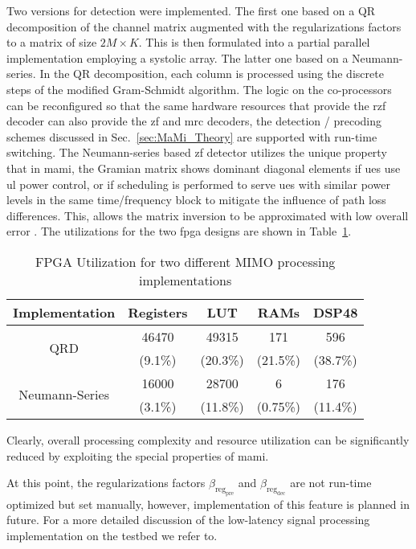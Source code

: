\documentclass[journal]{IEEEtran}
\begin{document}
Two versions for detection were implemented.
The first one based on a QR decomposition of the channel matrix augmented with the regularizations factors to a matrix of size $2M\times K$.
This is then formulated into a partial parallel implementation employing a systolic array\cite{1285069}.
The latter one based on a Neumann-series\cite{Prabhu2013}.
In the QR decomposition, each column is processed using the discrete steps of the modified Gram-Schmidt algorithm.
The logic on the co-processors can be reconfigured so that the same hardware resources that provide the \gls{rzf} decoder can also provide the \gls{zf} and \gls{mrc} decoders, \ie the detection / precoding schemes discussed in Sec.~\ref{sec:MaMi_Theory} are supported with run-time switching.
The Neumann-series based \gls{zf} detector utilizes the unique property that in \gls{mami}, the Gramian matrix shows dominant diagonal elements if \glspl{ue} use \gls{ul} power control, or if scheduling is performed to serve \glspl{ue} with similar power levels in the same time/frequency block to mitigate the influence of path loss differences. This, allows the matrix inversion to be approximated with low overall error \cite{Prabhu2013}.
The utilizations for the two \gls{fpga} designs are shown in Table~\ref{tab:FPGA_resources}.
\begin{table}[t]
	\centering
	\small
	\caption{FPGA Utilization for two different MIMO processing implementations}
	\noindent\begin{tabular}{ccccc}
		\toprule
		Implementation & Registers & LUT & RAMs & DSP48\\
		\midrule
		\multirow{2}{*}{QRD} & 46470  & 49315  & 171 & 596 \\
		& (9.1\%) & (20.3\%) & (21.5\%) & (38.7\%) \\
		\midrule
		\multirow{2}{*}{Neumann-Series} & 16000  & 28700 & 6 & 176 \\
		& (3.1\%) & (11.8\%) & (0.75\%) & (11.4\%) \\
		\bottomrule
	\end{tabular}
%
%
%
%
	\label{tab:FPGA_resources}
\end{table}
Clearly, overall processing complexity and resource utilization can be significantly reduced by exploiting the special properties of \gls{mami}.
%
%
%

At this point, the regularizations factors $\beta_{\mathrm{reg}_\mathrm{pre}}$ and $\beta_{\mathrm{reg}_\mathrm{dec}}$ are not run-time optimized but set manually, however, implementation of this feature is planned in future.
For a more detailed discussion of the low-latency signal processing implementation on the testbed we refer to\cite{sips_steffen}.
\end{document}
